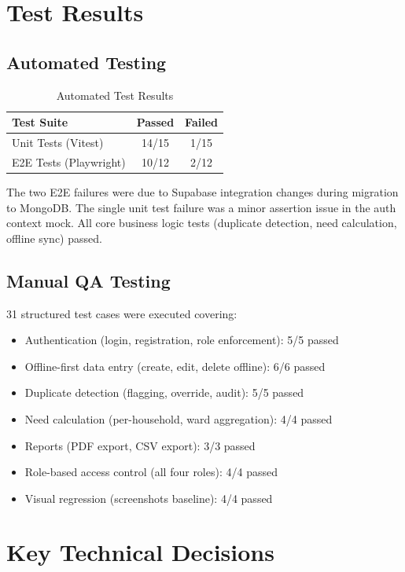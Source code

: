 \section{Test Results}

\subsection{Automated Testing}

\begin{table}[H]
\centering
\caption{Automated Test Results}
\begin{tabular}{@{}lcc@{}}
\toprule
\textbf{Test Suite} & \textbf{Passed} & \textbf{Failed} \\
\midrule
Unit Tests (Vitest) & 14/15 & 1/15 \\
E2E Tests (Playwright) & 10/12 & 2/12 \\
\bottomrule
\end{tabular}
\end{table}

The two E2E failures were due to Supabase integration changes during migration to MongoDB. The single unit test failure was a minor assertion issue in the auth context mock. All core business logic tests (duplicate detection, need calculation, offline sync) passed.

\subsection{Manual QA Testing}

31 structured test cases were executed covering:
\begin{itemize}[leftmargin=1.2cm]
    \item Authentication (login, registration, role enforcement): 5/5 passed
    \item Offline-first data entry (create, edit, delete offline): 6/6 passed
    \item Duplicate detection (flagging, override, audit): 5/5 passed
    \item Need calculation (per-household, ward aggregation): 4/4 passed
    \item Reports (PDF export, CSV export): 3/3 passed
    \item Role-based access control (all four roles): 4/4 passed
    \item Visual regression (screenshots baseline): 4/4 passed
\end{itemize}

\section{Key Technical Decisions}

